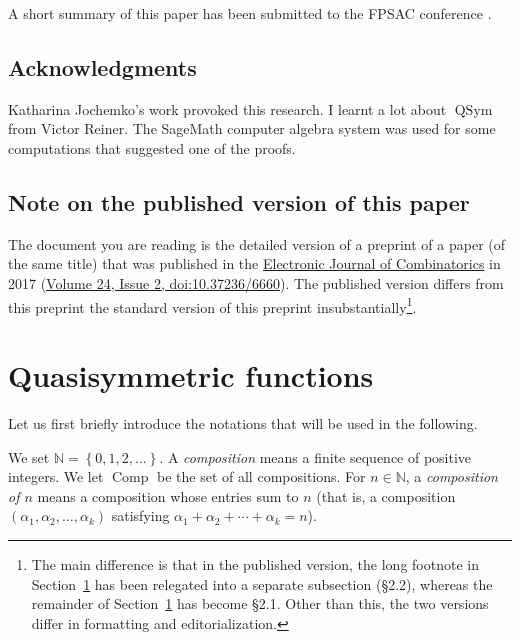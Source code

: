 \documentclass[numbers=enddot,12pt,final,onecolumn,notitlepage,abstracton]{scrartcl}
\theoremstyle{definition}
\newenvironment{verlong}{}{}
\newenvironment{vershort}{}{}
\newcommand{\Comp}{{\operatorname{Comp}}}
\newcommand{\QSym}{{\operatorname{QSym}}}
\newcommand{\NN}{{\mathbb{N}}}
\begin{document}
A short summary of this paper has been submitted to the FPSAC
conference \cite{Gri-extabs}.

\subsection*{Acknowledgments}

Katharina Jochemko's work \cite{Joch} provoked this research.
I learnt a lot about $\QSym$ from Victor Reiner. The SageMath
computer algebra system \cite{SageMath} was used for some
computations that suggested one of the proofs.

\subsection*{Note on the published version of this paper}

The document you are reading is the
\begin{verlong}
detailed version of a
\end{verlong}
preprint of a paper (of the
same title) that was
published in the
\href{http://www.combinatorics.org/}{Electronic Journal of
Combinatorics}
in 2017
(\href{https://doi.org/10.37236/6660}{Volume 24, Issue 2,
doi:10.37236/6660}).
The published version differs from
\begin{vershort}
this preprint
\end{vershort}
\begin{verlong}
the standard version of this preprint
\end{verlong}
insubstantially\footnote{The main difference is that in the
published version, the long footnote in
Section~\ref{sect.qsym-intro} has been relegated into a
separate subsection (\S 2.2), whereas the remainder of
Section~\ref{sect.qsym-intro} has become \S 2.1.
Other than this, the two versions differ in formatting and
editorialization.}.

\section{Quasisymmetric functions}
\label{sect.qsym-intro}

Let us first briefly introduce the notations that will be used in the
following.

We set $\NN = \left\{0, 1, 2, \ldots\right\}$. A \textit{composition}
means a finite sequence of positive integers. We let $\Comp$ be the set
of all compositions. For $n \in \NN$, a \textit{composition of $n$}
means a composition whose entries sum to $n$ (that is, a composition
$\left(\alpha_1, \alpha_2, \ldots, \alpha_k\right)$ satisfying
$\alpha_1 + \alpha_2 + \cdots + \alpha_k = n$).
\end{document}
